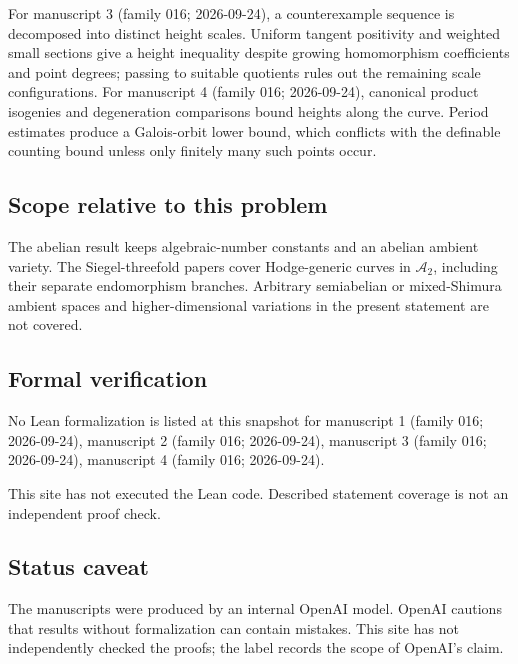 \documentclass[11pt]{article}
\begin{document}
For manuscript 3 (family 016; 2026-09-24), a counterexample sequence is decomposed into distinct height scales. Uniform tangent positivity and weighted small sections give a height inequality despite growing homomorphism coefficients and point degrees; passing to suitable quotients rules out the remaining scale configurations. For manuscript 4 (family 016; 2026-09-24), canonical product isogenies and degeneration comparisons bound heights along the curve. Period estimates produce a Galois-orbit lower bound, which conflicts with the definable counting bound unless only finitely many such points occur.

\subsection{Scope relative to this problem}
The abelian result keeps algebraic-number constants and an abelian ambient variety. The Siegel-threefold papers cover Hodge-generic curves in $\mathcal A_2$, including their separate endomorphism branches. Arbitrary semiabelian or mixed-Shimura ambient spaces and higher-dimensional variations in the present statement are not covered.

\subsection{Formal verification}
No Lean formalization is listed at this snapshot for manuscript 1 (family 016; 2026-09-24), manuscript 2 (family 016; 2026-09-24), manuscript 3 (family 016; 2026-09-24), manuscript 4 (family 016; 2026-09-24).

This site has not executed the Lean code. Described statement coverage is not an independent proof check.

\subsection{Status caveat}
The manuscripts were produced by an internal OpenAI model. OpenAI cautions that results without formalization can contain mistakes. This site has not independently checked the proofs; the label records the scope of OpenAI's claim.
\end{document}
